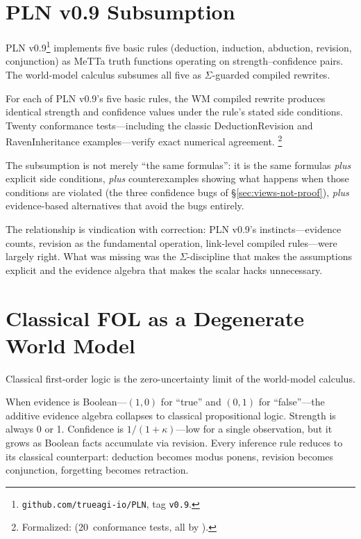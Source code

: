 \documentclass[11pt,openany]{report}
\begin{document}
\section{PLN v0.9 Subsumption}
\label{sec:bridge-pln09}

PLN v0.9\footnote{\texttt{github.com/trueagi-io/PLN}, tag
\texttt{v0.9}.} implements five basic rules (deduction, induction,
abduction, revision, conjunction) as MeTTa truth functions operating
on strength--confidence pairs.  The world-model calculus subsumes
all five as $\Sigma$-guarded compiled rewrites.

\begin{theorem}
\label{thm:pln09-conformance}
For each of PLN v0.9's five basic rules, the WM compiled rewrite
produces identical strength and confidence values under the
rule's stated side conditions.  Twenty conformance tests---including
the classic DeductionRevision and RavenInheritance
examples---verify exact numerical agreement.%
\footnote{Formalized:
(20~conformance tests, all by ).}
\end{theorem}

\noindent
The subsumption is not merely ``the same formulas'': it is the
same formulas \emph{plus} explicit side conditions, \emph{plus}
counterexamples showing what happens when those conditions are
violated (the three confidence bugs of \S\ref{sec:views-not-proof}),
\emph{plus} evidence-based alternatives that avoid the bugs entirely.

The relationship is vindication with correction: PLN v0.9's
instincts---evidence counts, revision as the fundamental operation,
link-level compiled rules---were largely right.  What was missing
was the $\Sigma$-discipline that makes the assumptions explicit and
the evidence algebra that makes the scalar hacks unnecessary.


\section{Classical FOL as a Degenerate World Model}
\label{sec:bridge-fol}

Classical first-order logic is the zero-uncertainty limit of the
world-model calculus.

When evidence is Boolean---$(1, 0)$ for ``true'' and $(0, 1)$ for
``false''---the additive evidence algebra collapses to classical
propositional logic.  Strength is always 0 or 1.  Confidence
is $1/(1+\kappa)$---low for a single observation, but it grows
as Boolean facts accumulate via revision.
Every inference rule reduces to its classical
counterpart: deduction becomes modus ponens, revision becomes
conjunction, forgetting becomes retraction.
\end{document}
